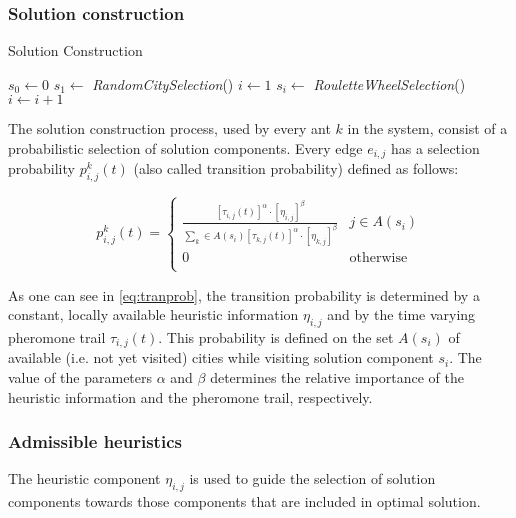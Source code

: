 \begin{homeworkProblem}
\subsubsection{Solution construction}
\begin{algorithm}[!h]
  \caption{Solution Construction}\label{solConstr}
  \begin{algorithmic}[1]
      \State {}
      \State $s_0 \gets 0$ 
      \State $s_1 \gets$ \emph{RandomCitySelection}() 
      \State $i \gets 1$
        \State $s_i \gets $ \emph{RouletteWheelSelection}()  
        \State $i \gets i+1$
      \EndWhile
    \EndProcedure
\end{algorithmic}
\end{algorithm}

The solution construction process, used by every ant $k$ in the system, consist of a probabilistic selection of solution components.
Every edge $e_{i,j}$ has a selection probability $p_{i,j}^k(t)$ (also called transition probability) defined as follows:

\begin{equation} \label{eq:tranprob}
p_{i,j}^k(t) = \begin{cases}
  \frac{[\tau_{i,j}(t)]^\alpha \cdot [\eta_{i,j}]^\beta}{\sum_{k} \in A(s_{i}) [\tau_{k,j}(t)]^\alpha \cdot [\eta_{k,j}]^\beta} & j \in A(s_{i}) \\
 0 & \text{otherwise} \\
\end{cases}
\end{equation}

As one can see in \ref{eq:tranprob}, the transition probability is determined by a constant, locally available heuristic information $\eta_{i,j}$ and by the time varying pheromone trail $\tau_{i,j}(t)$.
This probability is defined on the set $A(s_i)$ of available (i.e. not yet visited) cities while visiting solution component $s_i$.
The value of the parameters $\alpha$ and $\beta$ determines the relative importance of the heuristic information and the pheromone trail, respectively.

\subsubsection{Admissible heuristics}
The heuristic component $\eta_{i,j}$ is used to guide the selection of solution components towards those components that are included in optimal solution.


\end{homeworkProblem}
